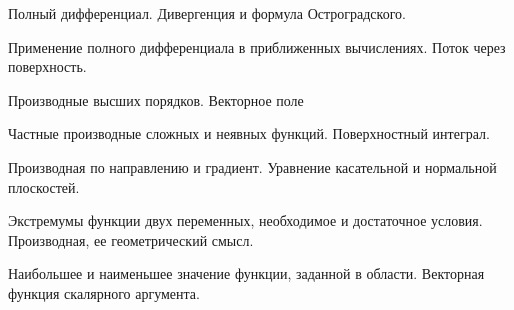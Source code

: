 \documentclass[
	14pt,
	a4paper,
	]
	{scrartcl}
\begin{document}
\vfill

\newpage


\shapk
{}
\setcounter{zad}{0}

\vfill
\z Полный дифференциал.
 \vfill
\z Дивергенция и формула Остроградского.
 \vfill

\vfill

\newpage


\shapk
{}
\setcounter{zad}{0}

\vfill
\z Применение полного дифференциала в приближенных вычислениях.
 \vfill
\z Поток через поверхность.
 \vfill

\vfill

\newpage


\shapk
{}
\setcounter{zad}{0}

\vfill
\z Производные высших порядков.
 \vfill
\z Векторное поле
 \vfill

\vfill

\newpage


\shapk
{}
\setcounter{zad}{0}

\vfill
\z Частные производные сложных и неявных функций.
 \vfill
\z Поверхностный интеграл.
 \vfill

\vfill

\newpage


\shapk
{}
\setcounter{zad}{0}

\vfill
\z Производная по направлению и градиент.
 \vfill
\z Уравнение касательной и нормальной плоскостей.
 \vfill

\vfill

\newpage


\shapk
{}
\setcounter{zad}{0}

\vfill
\z Экстремумы функции двух переменных, необходимое и достаточное условия.
 \vfill
\z Производная, ее геометрический смысл.
 \vfill

\vfill

\newpage


\shapk
{}
\setcounter{zad}{0}

\vfill
\z Наибольшее и наименьшее значение функции, заданной в области.
 \vfill
\z Векторная функция скалярного аргумента.
 \vfill

\vfill

\newpage


\shapk
{}
\setcounter{zad}{0}
\end{document}

